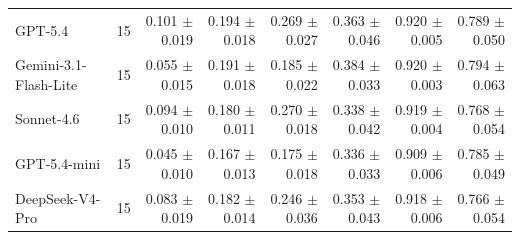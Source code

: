 \begin{table}[t]
\begin{tabular*}{\textwidth}{@{\extracolsep{\fill}}lrrrrrrr@{}}
GPT-5.4 & 15 & \shortstack[r]{0.101\\{\scriptsize $\pm$0.019}} & \shortstack[r]{0.194\\{\scriptsize $\pm$0.018}} & \shortstack[r]{0.269\\{\scriptsize $\pm$0.027}} & \shortstack[r]{0.363\\{\scriptsize $\pm$0.046}} & \shortstack[r]{0.920\\{\scriptsize $\pm$0.005}} & \shortstack[r]{0.789\\{\scriptsize $\pm$0.050}} \\
Gemini-3.1-Flash-Lite & 15 & \shortstack[r]{0.055\\{\scriptsize $\pm$0.015}} & \shortstack[r]{0.191\\{\scriptsize $\pm$0.018}} & \shortstack[r]{0.185\\{\scriptsize $\pm$0.022}} & \shortstack[r]{0.384\\{\scriptsize $\pm$0.033}} & \shortstack[r]{0.920\\{\scriptsize $\pm$0.003}} & \shortstack[r]{0.794\\{\scriptsize $\pm$0.063}} \\
Sonnet-4.6 & 15 & \shortstack[r]{0.094\\{\scriptsize $\pm$0.010}} & \shortstack[r]{0.180\\{\scriptsize $\pm$0.011}} & \shortstack[r]{0.270\\{\scriptsize $\pm$0.018}} & \shortstack[r]{0.338\\{\scriptsize $\pm$0.042}} & \shortstack[r]{0.919\\{\scriptsize $\pm$0.004}} & \shortstack[r]{0.768\\{\scriptsize $\pm$0.054}} \\
GPT-5.4-mini & 15 & \shortstack[r]{0.045\\{\scriptsize $\pm$0.010}} & \shortstack[r]{0.167\\{\scriptsize $\pm$0.013}} & \shortstack[r]{0.175\\{\scriptsize $\pm$0.018}} & \shortstack[r]{0.336\\{\scriptsize $\pm$0.033}} & \shortstack[r]{0.909\\{\scriptsize $\pm$0.006}} & \shortstack[r]{0.785\\{\scriptsize $\pm$0.049}} \\
DeepSeek-V4-Pro & 15 & \shortstack[r]{0.083\\{\scriptsize $\pm$0.019}} & \shortstack[r]{0.182\\{\scriptsize $\pm$0.014}} & \shortstack[r]{0.246\\{\scriptsize $\pm$0.036}} & \shortstack[r]{0.353\\{\scriptsize $\pm$0.043}} & \shortstack[r]{0.918\\{\scriptsize $\pm$0.006}} & \shortstack[r]{0.766\\{\scriptsize $\pm$0.054}} \\

\end{tabular*}
\end{table}
